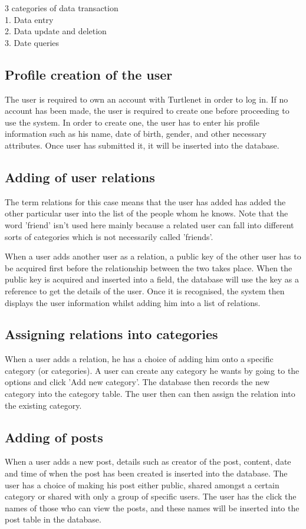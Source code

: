 3 categories of data transaction\\
1. Data entry\\
2. Data update and deletion\\
3. Date queries\\

\subsection{Profile creation of the user}
The user is required to own an account with Turtlenet in order to log in. If
no account has been made, the user is required to create one before proceeding
to use the system. In order to create one, the user has to enter his profile
information such as his name, date of birth, gender, and other necessary
attributes. Once user has submitted it, it will be inserted into the database.

\subsection{Adding of user relations}
The term relations for this case means that the user has added has added the
other particular user into the list of the people whom he knows. Note that the
word 'friend' isn't used here mainly because a related user can fall into
different sorts of categories which is not necessarily called 'friends'.

When a user adds another user as a relation, a public key of the other user has
to be acquired first before the relationship between the two takes place. When
the public key is acquired and inserted into a field, the database will use the
key as a reference to get the details of the user. Once it is recognised, the
system then displays the user information whilst adding him into a list of
relations.

\subsection{Assigning relations into categories}
When a user adds a relation, he has a choice of adding him onto a specific
category (or categories). A user can create any category he wants by going to
the options and click 'Add new category'. The database then records the new
category into the category table.  The user then can then assign the relation
into the existing category. 

\subsection{Adding of posts}
When a user adds a new post, details such as creator of the post, content, date
and time of when the post has been created is inserted into the database. The
user has a choice of making his post either public, shared amongst a certain
category or shared with only a group of specific users. The user has the click
the names of those who can view the posts, and these names will be inserted into
the post table in the database.

